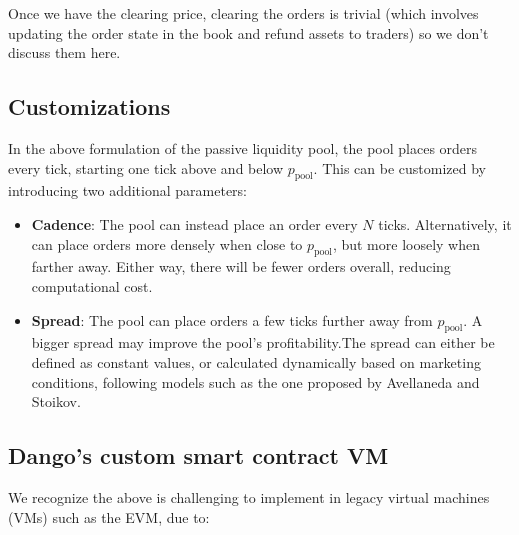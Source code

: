 \documentclass{article}
\begin{document}
Once we have the clearing price, clearing the orders is trivial (which involves updating the order state in the book and refund assets to traders) so we don't discuss them here.

\subsection{Customizations}

In the above formulation of the passive liquidity pool, the pool places orders every tick, starting one tick above and below $p_{\mathrm{pool}}$. This can be customized by introducing two additional parameters:

\begin{itemize}
  \item \textbf{Cadence}: The pool can instead place an order every $N$ ticks. Alternatively, it can place orders more densely when close to $p_{\mathrm{pool}}$, but more loosely when farther away. Either way, there will be fewer orders overall, reducing computational cost.
  \item \textbf{Spread}: The pool can place orders a few ticks further away from $p_{\mathrm{pool}}$. A bigger spread may improve the pool's profitability.The spread can either be defined as constant values, or calculated dynamically based on marketing conditions, following models such as the one proposed by Avellaneda and Stoikov.\supercite{avellanedastoikov}
\end{itemize}

\subsection{Dango's custom smart contract VM}

We recognize the above is challenging to implement in legacy virtual machines (VMs) such as the EVM, due to:
\end{document}
